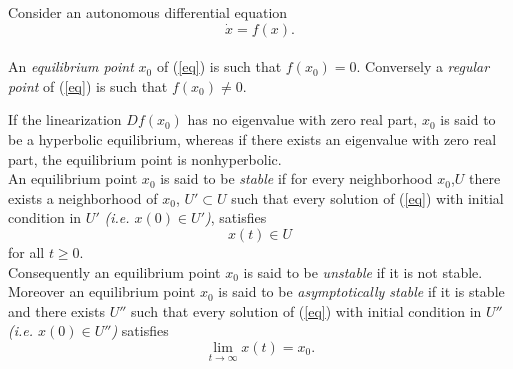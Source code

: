 \documentclass[12pt]{article}
\begin{document}

Consider an autonomous differential equation
\begin{equation}
\dot{x}=f(x).
\label{eq}
\end{equation}
\\

An \emph{equilibrium point} $x_0$ of (\ref{eq}) is such that $f(x_0)=0$.  Conversely a \emph{regular point} of (\ref{eq}) is such that $f(x_0)\neq 0$.

If the linearization $Df(x_0)$ has no eigenvalue with zero real 
part, $x_0$ is said to be a hyperbolic equilibrium, whereas if 
there exists an eigenvalue with zero real part, the equilibrium 
point is nonhyperbolic.\\

An equilibrium point $x_0$ is said to be \emph{stable} if for 
every neighborhood $x_0$,$U$ there exists a neighborhood 
of $x_0$, $U'\subset U$ such that every solution of (\ref{eq}) 
with initial condition in $U'$ \textit{(i.e. $x(0)\in U'$)}, 
satisfies
$$x(t)\in U$$
for all $t\geq0$.\\

Consequently an equilibrium point $x_0$ is said to be 
\emph{unstable} if it is not stable.\\

Moreover an equilibrium point $x_0$ is said to be 
\emph{asymptotically stable} if it is stable and there exists 
$U''$ such that every solution of (\ref{eq}) with initial 
condition in $U''$ \textit{(i.e. $x(0)\in U''$)} satisfies
$$\lim_{t\to\infty}x(t)=x_0.$$
\end{document}
